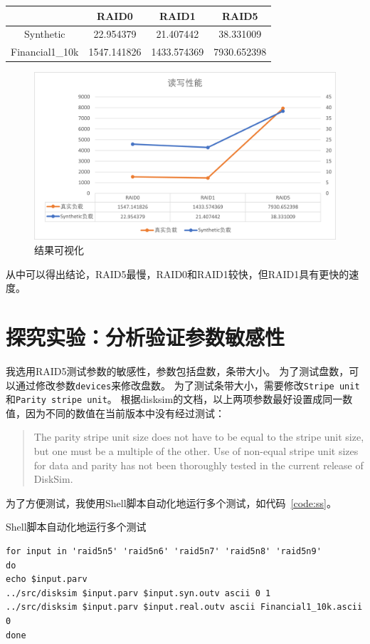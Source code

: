 \documentclass[a4paper,twoside]{article}
\begin{document}
\begin{spacing}{1.2}
\begin{table}[h]
\begin{tabular}{c|c|c|c}
		\hline
		& RAID0 & RAID1 & RAID5 \\ \hline
		Synthetic & 22.954379 & 21.407442 & 38.331009 \\
		\hline
		Financial1\_10k & 1547.141826 & 1433.574369	& 7930.652398		\\ 
		\hline
		\bottomrule
	\end{tabular}
\end{table}
\begin{figure}[ht]
	\centering
	\caption{结果可视化}
	\label{fig:vis}
	\includegraphics[width=0.6\linewidth]{res.png}
\end{figure}
从中可以得出结论，RAID5最慢，RAID0和RAID1较快，但RAID1具有更快的速度。

\section{探究实验：分析验证参数敏感性}

我选用RAID5测试参数的敏感性，参数包括盘数，条带大小。
为了测试盘数，可以通过修改参数\texttt{devices}来修改盘数。
为了测试条带大小，需要修改\texttt{Stripe unit}和\texttt{Parity stripe unit}。
根据disksim的文档，以上两项参数最好设置成同一数值，因为不同的数值在当前版本中没有经过测试：
\begin{quotation}
The parity stripe unit size does not have to be equal
to the stripe unit size, but one must be a multiple of the other. Use of non-equal stripe unit
sizes for data and parity has not been thoroughly tested in the current release of DiskSim.
\end{quotation}

为了方便测试，我使用Shell脚本自动化地运行多个测试，如代码~\ref{code:ss}。
\begin{listing}[htb]
	\caption{Shell脚本自动化地运行多个测试}
	\label{code:ss}
	\begin{verbatim}
for input in 'raid5n5' 'raid5n6' 'raid5n7' 'raid5n8' 'raid5n9'
do
echo $input.parv
../src/disksim $input.parv $input.syn.outv ascii 0 1
../src/disksim $input.parv $input.real.outv ascii Financial1_10k.ascii 0
done


\end{verbatim}
\end{listing}
\end{spacing}
\end{document}
